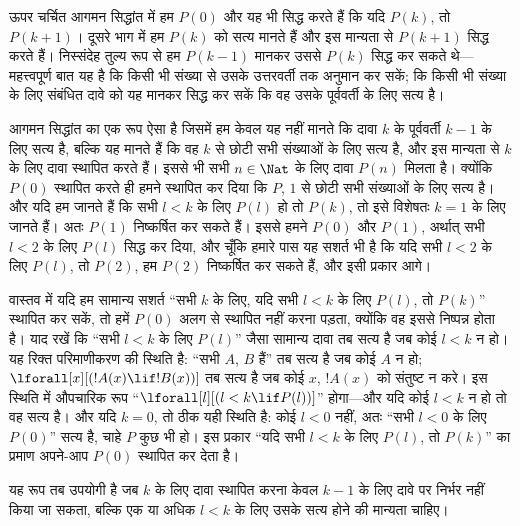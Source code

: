 \documentclass[../../../include/open-logic-section]{subfiles}
\begin{document}


ऊपर चर्चित आगमन सिद्धांत में हम $P(0)$ और यह भी सिद्ध करते हैं कि यदि
$P(k)$, तो $P(k+1)$। दूसरे भाग में हम $P(k)$ को सत्य मानते हैं और इस
मान्यता से $P(k+1)$ सिद्ध करते हैं। निस्संदेह तुल्य रूप से हम $P(k-1)$ मानकर
उससे $P(k)$ सिद्ध कर सकते थे---महत्त्वपूर्ण बात यह है कि किसी भी संख्या से
उसके उत्तरवर्ती तक अनुमान कर सकें; कि किसी भी संख्या के लिए संबंधित दावे को
यह मानकर सिद्ध कर सकें कि वह उसके पूर्ववर्ती के लिए सत्य है।

आगमन सिद्धांत का एक रूप ऐसा है जिसमें हम केवल यह नहीं मानते कि दावा $k$ के
पूर्ववर्ती $k-1$ के लिए सत्य है, बल्कि यह मानते हैं कि वह $k$ से छोटी सभी
संख्याओं के लिए सत्य है, और इस मान्यता से $k$ के लिए दावा स्थापित करते हैं।
इससे भी सभी $n\in\Nat$ के लिए दावा $P(n)$ मिलता है। क्योंकि $P(0)$ स्थापित
करते ही हमने स्थापित कर दिया कि $P$, $1$ से छोटी सभी संख्याओं के लिए सत्य
है। और यदि हम जानते हैं कि सभी $l<k$ के लिए $P(l)$ हो तो $P(k)$, तो इसे
विशेषतः $k=1$ के लिए जानते हैं। अतः $P(1)$ निष्कर्षित कर सकते हैं। इससे हमने
$P(0)$ और $P(1)$, अर्थात् सभी $l<2$ के लिए $P(l)$ सिद्ध कर दिया, और चूँकि
हमारे पास यह सशर्त भी है कि यदि सभी $l<2$ के लिए $P(l)$, तो $P(2)$, हम
$P(2)$ निष्कर्षित कर सकते हैं, और इसी प्रकार आगे।

वास्तव में यदि हम सामान्य सशर्त ``सभी $k$ के लिए, यदि सभी $l<k$ के लिए
$P(l)$, तो $P(k)$'' स्थापित कर सकें, तो हमें $P(0)$ अलग से स्थापित नहीं
करना पड़ता, क्योंकि वह इससे निष्पन्न होता है। याद रखें कि ``सभी $l<k$ के
लिए $P(l)$'' जैसा सामान्य दावा तब सत्य है जब कोई $l<k$ न हो। यह रिक्त
परिमाणीकरण की स्थिति है: ``सभी $A$, $B$ हैं'' तब सत्य है जब कोई $A$ न हो;
$\lforall[x][(!A(x)\lif !B(x))]$ तब सत्य है जब कोई $x$, $!A(x)$ को संतुष्ट
न करे। इस स्थिति में औपचारिक रूप ``$\lforall[l][(l<k\lif P(l))]$'' होगा---और
यदि कोई $l<k$ न हो तो वह सत्य है। और यदि $k=0$, तो ठीक यही स्थिति है: कोई
$l<0$ नहीं, अतः ``सभी $l<0$ के लिए $P(0)$'' सत्य है, चाहे $P$ कुछ भी हो।
इस प्रकार ``यदि सभी $l<k$ के लिए $P(l)$, तो $P(k)$'' का प्रमाण अपने-आप
$P(0)$ स्थापित कर देता है।

यह रूप तब उपयोगी है जब $k$ के लिए दावा स्थापित करना केवल $k-1$ के लिए दावे
पर निर्भर नहीं किया जा सकता, बल्कि एक या अधिक $l<k$ के लिए उसके सत्य होने
की मान्यता चाहिए।
\end{document}

